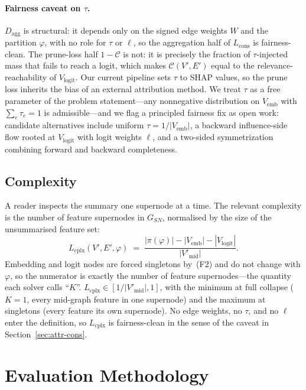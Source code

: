 \paragraph{Fairness caveat on $\tau$.}
$D_{\text{agg}}$ is structural: it depends only on the signed edge
weights $W$ and the partition $\varphi$, with no role for $\tau$ or
$\ell$, so the aggregation half of $L_{\text{cons}}$ is fairness-clean. The
prune-loss half $1 - \mathcal{C}$ is not: it is precisely the
fraction of $\tau$-injected mass that fails to reach a logit, which
makes $\mathcal{C}(V', E')$ equal to the relevance-reachability of
$V_{\text{logit}}$. Our current pipeline sets $\tau$ to SHAP values,
so the prune loss inherits the bias of an external attribution
method. We treat $\tau$ as a free parameter of the problem
statement---any nonnegative distribution on $V_{\text{emb}}$ with
$\sum_e \tau_e = 1$ is admissible---and we flag a principled fairness
fix as open work: candidate alternatives include uniform $\tau =
1/|V_{\text{emb}}|$, a backward influence-side flow rooted at
$V_{\text{logit}}$ with logit weights $\ell$, and a two-sided
symmetrization combining forward and backward completeness.

\subsection{Complexity}\label{sec:attr-cplx}

A reader inspects the summary one supernode at a time. The relevant
complexity is the number of feature supernodes in $G_{SN}$,
normalised by the size of the unsummarised feature set:
\begin{equation}
L_{\text{cplx}}(V', E', \varphi)
\;=\;
\frac{|\pi(\varphi)| - |V_{\text{emb}}| - |V_{\text{logit}}|}
     {|V'_{\text{mid}}|}.
\label{eq:Lcplx}
\end{equation}
Embedding and logit nodes are forced singletons by~(F2) and do not
change with $\varphi$, so the numerator is exactly the number of
feature supernodes---the quantity each solver calls ``$K$''. $L_{\text{cplx}}
\in [1/|V'_{\text{mid}}|, 1]$, with the minimum at full collapse
($K = 1$, every mid-graph feature in one supernode) and the maximum
at singletons (every feature its own supernode). No edge weights, no
$\tau$, and no $\ell$ enter the definition, so $L_{\text{cplx}}$ is
fairness-clean in the sense of the caveat in
Section~\ref{sec:attr-cons}.

\section{Evaluation Methodology}\label{sec:eval}

